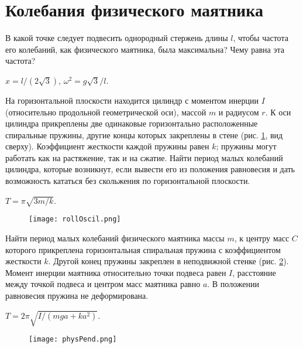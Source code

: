 \section{Колебания физического маятника}

\begin{ex} %
В какой точке следует подвесить однородный стержень длины  $l$, чтобы частота его колебаний, как физического маятника, была максимальна? Чему равна эта частота?
\begin{ans}
$x = l/(2\sqrt{3})$, $\omega^2 = g\sqrt{3} / l$.
\end{ans}
\end{ex}	

\begin{ex} %
На горизонтальной плоскости находится цилиндр с моментом инерции $I$ (относительно продольной геометрической оси), массой $m$ и радиусом $r$. К оси цилиндра прикреплены две одинаковые горизонтально расположенные спиральные пружины, другие концы которых закреплены в стене (рис. \ref{rollOscil}, вид сверху). Коэффициент жесткости каждой пружины равен $k$; пружины могут работать как на растяжение, так и на сжатие. Найти период малых колебаний цилиндра, которые возникнут, если вывести его из положения равновесия и дать возможность кататься без скольжения по горизонтальной плоскости.
\begin{ans}
$T =  \pi\sqrt{3m/k}$.
\end{ans}
\end{ex}	

\begin{figure}[h]
\centering
\texttt{[image: rollOscil.png]}
\caption{}
\label{rollOscil}
\end{figure}

\begin{ex} %
Найти период малых колебаний физического маятника массы $m$, к центру масс $C$ которого прикреплена горизонтальная спиральная пружина с коэффициентом жесткости $k$. Другой конец пружины закреплен в неподвижной стенке (рис. \ref{physPend}). Момент инерции маятника относительно точки подвеса равен $I$, расстояние между точкой подвеса и центром масс маятника равно $a$. В положении равновесия пружина не деформирована.
\begin{ans}
$T = 2 \pi \sqrt{I/(mga + ka^2)}$.
\end{ans}
\end{ex}	

\begin{figure}[h]
\centering
\texttt{[image: physPend.png]}
\caption{}
\label{physPend}
\end{figure}


